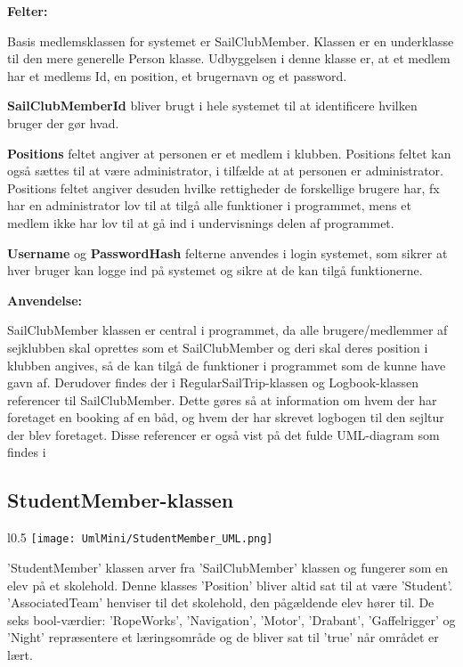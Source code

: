 \textbf{Felter:}

Basis medlemsklassen for systemet er SailClubMember. 
Klassen er en underklasse til den mere generelle Person klasse. 
Udbyggelsen i denne klasse er, at et medlem har et medlems Id, en position, et brugernavn og et password.

\textbf{SailClubMemberId} bliver brugt i hele systemet til at identificere hvilken bruger der gør hvad. 

\textbf{Positions} feltet angiver at personen er et medlem i klubben. 
Positions feltet kan også sættes til at være administrator, i tilfælde at at personen er administrator. 
Positions feltet angiver desuden hvilke rettigheder de forskellige brugere har, fx har en administrator lov til at tilgå alle funktioner i programmet, mens et medlem ikke har lov til at gå ind i undervisnings delen af programmet. 

\textbf{Username} og \textbf{PasswordHash} felterne anvendes i login systemet, som sikrer at hver bruger kan logge ind på systemet og sikre at de kan tilgå funktionerne.

\textbf{Anvendelse:}

SailClubMember klassen er central i programmet, da alle brugere/medlemmer af sejklubben skal oprettes som et SailClubMember og deri skal deres position i klubben angives, så de kan tilgå de funktioner i programmet som de kunne have gavn af. Derudover findes der i RegularSailTrip-klassen og Logbook-klassen referencer til SailClubMember. Dette gøres så at information om hvem der har foretaget en booking af en båd, og hvem der har skrevet logbogen til den sejltur der blev foretaget. Disse referencer er også vist på det fulde UML-diagram som findes i 

\subsection{StudentMember-klassen}
\begin{minipage}[t]{1\linewidth}
\begin{wrapfigure}{l}{0.5\textwidth}
\texttt{[image: UmlMini/StudentMember\_UML.png]}
\end{wrapfigure}

'StudentMember' klassen arver fra 'SailClubMember' klassen og fungerer som en elev på et skolehold. Denne klasses 'Position' bliver altid sat til at være 'Student'. 'AssociatedTeam' henviser til det skolehold, den pågældende elev hører til. De seks bool-værdier: 'RopeWorks', 'Navigation', 'Motor', 'Drabant', 'Gaffelrigger' og 'Night' repræsentere et læringsområde og de bliver sat til 'true' når området er lært.

\end{minipage}


